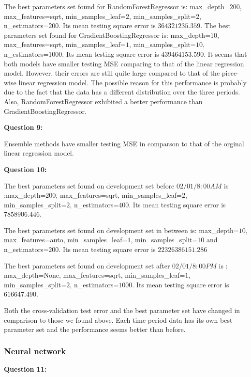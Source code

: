 \documentclass{article}
\begin{document}
The best parameters set found for RandomForestRegressor is: max\_depth=$200$, max\_features=sqrt, min\_samples\_leaf=$2$, min\_samples\_split=$2$, n\_estimators=$200$. Its mean testing square error is $364321235.359$.\newline
\indent The best parameters set found for GradientBoostingRegressor is: max\_depth=$10$, max\_features=sqrt, min\_samples\_leaf=$1$, min\_samples\_split=$10$, n\_estimators=$1000$. Its mean testing square error is $439464153.590$.\newline
\indent It seems that both models have smaller testing MSE comparing to that of the linear regression model. However, their errors are still quite large compared to that of the piece-wise linear regression model. The possible reason for this performance is probably due to the fact that the data has a different distribution over the three periods. Also, RandomForestRegressor exhibited a better performance than GradientBoostingRegressor.

\bigbreak
\textbf{Question 9:}

Ensemble methods have smaller testing MSE in comparson to that of the orginal linear regression model. 


\bigbreak
\textbf{Question 10:}

The best parameters set found on development set before $02/01/8:00AM$ is :max\_depth=$200$, max\_features=sqrt, min\_samples\_leaf=$2$, min\_samples\_split=$2$, n\_estimators=$400$. Its mean testing square error is $7858906.446$.

The best parameters set found on development set in between is: max\_depth=$10$, max\_features=auto, min\_samples\_leaf=$1$, min\_samples\_split=$10$ and n\_estimators=$200$. Its mean testing square error is $22326386151.286$

The best parameters set found on development set after $02/01/8:00PM$ is : max\_depth=None, max\_features=sqrt, min\_samples\_leaf=$1$, min\_samples\_split=$2$, n\_estimators=$1000$. Its mean testing square error is $616647.490$.

Both the cross-validation test error and the best parameter set have changed in comparison to those we found above. Each time period data has its own best parameter set and the performance seems better than before.



\bigbreak
\subsubsection{Neural network}
\textbf{Question 11:}
\end{document}

